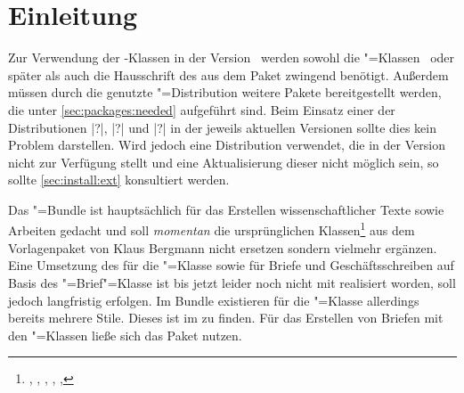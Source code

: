 \chapter{Einleitung}
%
Zur Verwendung der \TUDScript-Klassen in der Version~\vTUDScript{} werden 
sowohl die \KOMAScript"=Klassen~\vKOMAScript{} oder später als auch die 
Hausschrift des \CDs \OpenSans aus dem Paket  zwingend 
benötigt. Außerdem müssen durch die genutzte "=Distribution 
weitere Pakete bereitgestellt werden, die unter \autoref{sec:packages:needed} 
aufgeführt sind. Beim Einsatz einer der Distributionen
%
|?|,
|?| und 
|?|
in der jeweils aktuellen Versionen sollte dies kein Problem darstellen. Wird 
jedoch eine Distribution verwendet, die \TUDScript in der Version~\vTUDScript{} 
nicht zur Verfügung stellt und eine Aktualisierung dieser nicht möglich sein, 
so sollte \autoref{sec:install:ext} konsultiert werden.

Das \TUDScript"=Bundle ist hauptsächlich für das Erstellen wissenschaftlicher 
Texte sowie Arbeiten gedacht und soll \emph{momentan} die ursprünglichen 
Klassen\footnote{%
  , , , , 
  , %
} aus dem Vorlagenpaket von Klaus Bergmann nicht ersetzen sondern vielmehr 
ergänzen. 
%
Eine Umsetzung des \CDs für die "=Klasse sowie für Briefe und 
Geschäftsschreiben auf Basis des \KOMAScript"=Brief"=Klasse  
ist bis jetzt leider noch nicht mit \TUDScript realisiert worden, soll jedoch 
langfristig erfolgen. Im Bundle  existieren für die 
"=Klasse allerdings bereits mehrere Stile. Dieses ist im 
 zu finden. Für das Erstellen von Briefen mit den \TUDScript"=Klassen ließe 
sich das Paket  nutzen.



